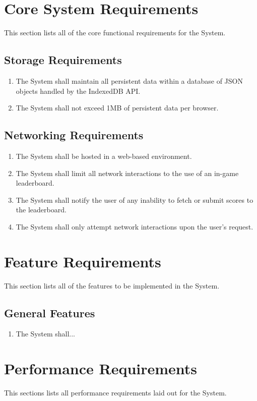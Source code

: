 \documentclass[12pt]{report}
\newenvironment{reqlist}{
	\renewcommand{\labelenumi}{\tab\thesubsection.\arabic{enumi}}
	\renewcommand{\labelenumii}{\thesubsection.\arabic{enumi}.\arabic{enumii}}
	\begin{enumerate}[itemsep = 1pt, parsep = 0pt, leftmargin = *]
}{\end{enumerate}}
\begin{document}
\section{Core System Requirements}
	This section lists all of the core functional requirements for the System.
	\subsection{Storage Requirements}
		\begin{reqlist}
			\item The System shall maintain all persistent data within a database of JSON objects handled by the IndexedDB API.
			\item The System shall not exceed 1MB of persistent data per browser.
		\end{reqlist}
	\subsection{Networking Requirements}
		\begin{reqlist}
			\item The System shall be hosted in a web-based environment.
			\item The System shall limit all network interactions to the use of an in-game leaderboard.
			\item The System shall notify the user of any inability to fetch or submit scores to the leaderboard.
			\item The System shall only attempt network interactions upon the user's request.
		\end{reqlist}
		
\section{Feature Requirements}
	This section lists all of the features to be implemented in the System.
	\subsection{General Features}
		\begin{reqlist}
			\item The System shall...
		\end{reqlist}

\section{Performance Requirements}
	This sections lists all performance requirements laid out for the System.
\end{document}
